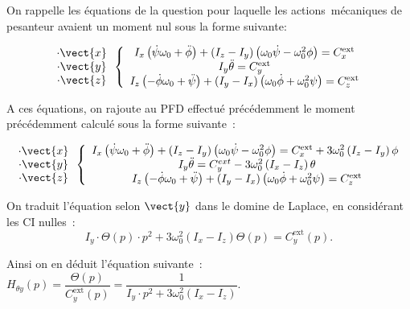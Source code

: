 \begin{corrige}

On rappelle les équations de la question  pour laquelle les
actions~mécaniques de pesanteur avaient un moment nul sous la forme
suivante:

$$
\begin{array}{c}
\cdot \vect{x}\\
\cdot \vect{y}\\
\cdot \vect{z}\\
\end{array}
\left\{
\begin{array}{c}
I_x\left(\dot{\psi}\omega_0+\ddot{\phi} \right)+\left(I_z-I_y\right)\left(\omega_0\dot{\psi}-\omega_0^2\phi\right)=C_x^{\text{ext}}\\
I_y\ddot{\theta}=C_y^{\text{ext}}\\
I_z\left(-\dot{\phi}\omega_0+\ddot{\psi}\right)
+\left(I_y-I_x \right)\left(\omega_0\dot{\phi}+\omega_0^2\psi\right)=C_z^{\text{ext}}\\
\end{array}
\right.
$$

A ces équations, on rajoute au PFD effectué précédemment  le moment précédemment calculé sous la forme suivante~:

$$
\begin{array}{c}
\cdot \vect{x}\\
\cdot \vect{y}\\
\cdot \vect{z}\\
\end{array}
\left\{
\begin{array}{c}
I_x\left(\dot{\psi}\omega_0+\ddot{\phi} \right)+\left(I_z-I_y\right)\left(\omega_0\dot{\psi}-\omega_0^2\phi\right)=C_x^{\text{ext}}+3\omega_0^2\left(I_z-I_y\right)\phi\\\
I_y\ddot{\theta}=C_y^{ext}-3\omega_0^2\left(I_x-I_z\right)\theta\\\
I_z\left(-\dot{\phi}\omega_0+\ddot{\psi}\right)
+\left(I_y-I_x \right)\left(\omega_0\dot{\phi}+\omega_0^2\psi\right)=C_z^{\text{ext}}\\
\end{array}
\right.
$$


On traduit l'équation selon $\vect{y}$ dans le domine de Laplace, en considérant
les CI nulles~: 
$$
I_y\cdot \Theta(p)\cdot p^2+3\omega_0^2\left(I_x-I_z\right)\Theta(p)=C_y^{\text{ext}}(p)
.$$

Ainsi on en déduit l'équation suivante~:
$ H_{\theta y}(p)=\dfrac{\Theta(p)}{C_y^{\text{ext}}(p)}=\dfrac{1}{I_y\cdot p^2+3\omega_0^2\left(I_x-I_z\right)}$.




\end{corrige}
